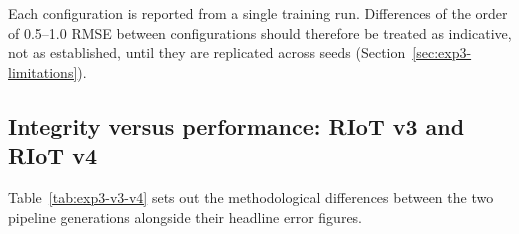 Each configuration is reported from a single training run.
Differences of the order of 0.5--1.0 RMSE between configurations should
therefore be treated as indicative, not as established, until they are
replicated across seeds (Section~\ref{sec:exp3-limitations}).

\subsection{Integrity versus performance: RIoT v3 and RIoT v4}
\label{sec:exp3-v3-v4}

Table~\ref{tab:exp3-v3-v4} sets out the methodological differences
between the two pipeline generations alongside their headline error
figures.

